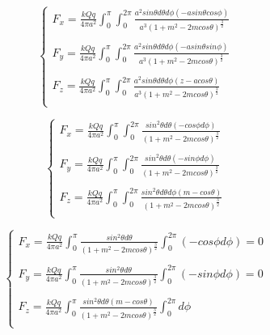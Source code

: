 \documentclass[12pt]{article}
\begin{document}
\begin{equation}
    \begin{cases}
        F_{x} = \frac{ kQq }{ 4\pi a^{2} }\int_{0}^{\pi} \int_{0}^{2\pi} \frac{ a^{2} sin\theta d\theta d\phi (-asin\theta cos\phi) }{ a^{3} {(1 + m^{2} - 2mcos\theta)}^{\frac{3}{2}} }\\ \\

        F_{y} = \frac{ kQq }{ 4\pi a^{2} }\int_{0}^{\pi} \int_{0}^{2\pi} \frac{ a^{2} sin\theta d\theta d\phi (-asin\theta sin\phi) }{ a^{3} {(1 + m^{2} - 2mcos\theta)}^{\frac{3}{2}} }\\ \\

        F_{z} = \frac{ kQq }{ 4\pi a^{2} }\int_{0}^{\pi} \int_{0}^{2\pi} \frac{ a^{2} sin\theta d\theta d\phi (z - acos\theta) }{ a^{3} {(1 + m^{2} - 2mcos\theta)}^{\frac{3}{2}} }\\

    \end{cases}
\end{equation}

\begin{equation}
    \begin{cases}
        F_{x} = \frac{ kQq }{ 4\pi a^{2} }\int_{0}^{\pi} \int_{0}^{2\pi} \frac{ sin^{2}\theta d \theta (-cos\phi d \phi) }{ {(1+m^{2} -2m cos\theta)}^{\frac{3}{2}} }\\ \\

        F_{y} = \frac{ kQq }{ 4\pi a^{2} }\int_{0}^{\pi} \int_{0}^{2\pi} \frac{ sin^{2}\theta d \theta (-sin\phi d \phi) }{ {(1+m^{2} -2m cos\theta)}^{\frac{3}{2}} }\\ \\

        F_{z} = \frac{ kQq }{ 4\pi a^{2} }\int_{0}^{\pi} \int_{0}^{2\pi} \frac{ sin^{2}\theta d \theta d \phi (m - cos\theta) }{ {(1+m^{2} -2m cos\theta)}^{\frac{3}{2}} }\\

    \end{cases}
\end{equation}

\begin{equation}
    \begin{cases}
        F_{x} = \frac{ kQq }{ 4\pi a^{2} }\int_{0}^{\pi} \frac{ sin^{2}\theta d \theta }{ {(1+m^{2} -2m cos\theta)}^{\frac{3}{2}} } \int_{0}^{2\pi} (-cos\phi d \phi) = 0 \\ \\

        F_{y} = \frac{ kQq }{ 4\pi a^{2} }\int_{0}^{\pi} \frac{ sin^{2}\theta d \theta }{ {(1+m^{2} -2m cos\theta)}^{\frac{3}{2}} } \int_{0}^{2\pi} (-sin\phi d \phi) = 0\\ \\

        F_{z} = \frac{ kQq }{ 4\pi a^{2} }\int_{0}^{\pi} \frac{ sin^{2}\theta d \theta (m - cos\theta) }{ {(1+m^{2} -2m cos\theta)}^{\frac{3}{2}} } \int_{0}^{2\pi} d \phi\\

    \end{cases}
\end{equation}
\end{document}
